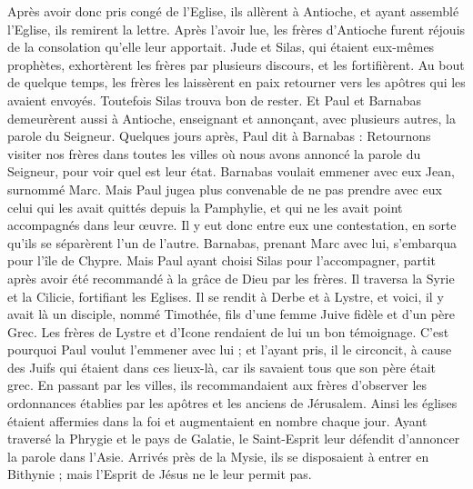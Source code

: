 \begin{multicols}{2}
Après avoir donc pris congé de l'Eglise, ils allèrent à Antioche, et ayant assemblé l'Eglise, ils remirent la lettre.
Après l'avoir lue, les frères d'Antioche furent réjouis de la consolation qu'elle leur apportait.
Jude et Silas, qui étaient eux-mêmes prophètes, exhortèrent les frères par plusieurs discours, et les fortifièrent.
Au bout de quelque temps, les frères les laissèrent en paix retourner vers les apôtres qui les avaient envoyés.
Toutefois Silas trouva bon de rester.
Et Paul et Barnabas demeurèrent aussi à Antioche, enseignant et annonçant, avec plusieurs autres, la parole du Seigneur.
Quelques jours après, Paul dit à Barnabas : Retournons visiter nos frères dans toutes les villes où nous avons annoncé la parole du Seigneur, pour voir quel est leur état.
Barnabas voulait emmener avec eux Jean, surnommé Marc.
Mais Paul jugea plus convenable de ne pas prendre avec eux celui qui les avait quittés depuis la Pamphylie, et qui ne les avait point accompagnés dans leur œuvre.
Il y eut donc entre eux une contestation, en sorte qu'ils se séparèrent l'un de l'autre. Barnabas, prenant Marc avec lui, s'embarqua pour l'île de Chypre.
Mais Paul ayant choisi Silas pour l'accompagner, partit après avoir été recommandé à la grâce de Dieu par les frères.
Il traversa la Syrie et la Cilicie, fortifiant les Eglises.
\VerseOne{}Il se rendit à Derbe et à Lystre, et voici, il y avait là un disciple, nommé Timothée, fils d'une femme Juive fidèle et d'un père Grec.
Les frères de Lystre et d'Icone rendaient de lui un bon témoignage.
C'est pourquoi Paul voulut l'emmener avec lui ; et l'ayant pris, il le circoncit, à cause des Juifs qui étaient dans ces lieux-là, car ils savaient tous que son père était grec.
En passant par les villes, ils recommandaient aux frères d'observer les ordonnances établies par les apôtres et les anciens de Jérusalem.
Ainsi les églises étaient affermies dans la foi et augmentaient en nombre chaque jour.
Ayant traversé la Phrygie et le pays de Galatie, le Saint-Esprit leur défendit d'annoncer la parole dans l'Asie.
Arrivés près de la Mysie, ils se disposaient à entrer en Bithynie ; mais l'Esprit de Jésus ne le leur permit pas.

\end{multicols}
